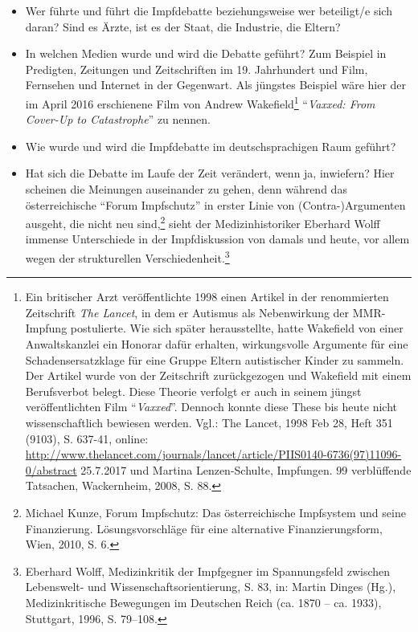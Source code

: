 \documentclass[
    a4paper,
    12pt,
    hyphens,
    chapterprefix=true,
    headheight=33pt,
    footheight=29pt,
    headings=optiontohead, %
]{scrartcl}
\begin{document}
\begin{itemize}
\item{Wer führte und führt die Impfdebatte beziehungsweise wer beteiligt/e sich daran? Sind es Ärzte, ist es der Staat, die Industrie, die Eltern?}
\item{In welchen Medien wurde und wird die Debatte geführt? Zum Beispiel in Predigten, Zeitungen und Zeitschriften im 19. Jahrhundert und Film, Fernsehen und Internet in der Gegenwart. Als jüngstes Beispiel wäre hier der im April 2016 erschienene Film von Andrew Wakefield\footnote{Ein britischer Arzt veröffentlichte 1998 einen Artikel in der renommierten Zeitschrift \textit{The Lancet}, in dem er Autismus als Nebenwirkung der MMR-Impfung postulierte. Wie sich später herausstellte, hatte Wakefield von einer Anwaltskanzlei ein Honorar dafür erhalten, wirkungsvolle Argumente für eine Schadensersatzklage für eine Gruppe Eltern autistischer Kinder zu sammeln. Der Artikel wurde von der Zeitschrift zurückgezogen und Wakefield mit einem Berufsverbot belegt. Diese Theorie verfolgt er auch in seinem jüngst veröffentlichten Film "`\textit{Vaxxed}"'. Dennoch konnte diese These bis heute nicht wissenschaftlich bewiesen werden. Vgl.: The Lancet, 1998 Feb 28, Heft 351 (9103), S. 637-41, online: \url{http://www.thelancet.com/journals/lancet/article/PIIS0140-6736(97)11096-0/abstract} 25.7.2017 und Martina Lenzen-Schulte, Impfungen. 99 verblüffende Tatsachen, Wackernheim, 2008, S. 88.} "`\textit{Vaxxed: From Cover-Up to Catastrophe}"'} zu nennen.
\item{Wie wurde und wird die Impfdebatte im deutschsprachigen Raum geführt? }
\item{Hat sich die Debatte im Laufe der Zeit verändert, wenn ja, inwiefern? Hier scheinen die Meinungen auseinander zu gehen, denn während das österreichische "`Forum Impfschutz"' in erster Linie von (Contra-)Argumenten ausgeht, die nicht neu sind,\footnote{Michael Kunze, Forum Impfschutz: Das österreichische Impfsystem und seine Finanzierung. Lösungsvorschläge für eine alternative Finanzierungsform, Wien, 2010, S. 6.} sieht der Medizinhistoriker Eberhard Wolff immense Unterschiede in der Impfdiskussion von damals und heute, vor allem wegen der strukturellen Verschiedenheit.\footnote{Eberhard Wolff, Medizinkritik der Impfgegner im Spannungsfeld zwischen Lebenswelt- und Wissenschaftsorientierung, S. 83, in: Martin Dinges (Hg.), Medizinkritische Bewegungen im Deutschen Reich (ca. 1870 -- ca. 1933), Stuttgart, 1996, S. 79--108.} }
\end{itemize}
\end{document}
